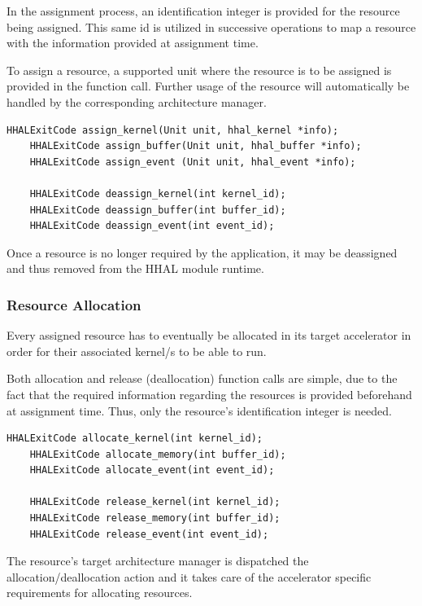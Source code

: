 In the assignment process, an identification integer is provided for the resource being assigned. This same id is utilized in successive operations to map a resource with the information provided at assignment time.

To assign a resource, a supported unit where the resource is to be assigned is provided in the function call. Further usage of the resource will automatically be handled by the corresponding architecture manager.

\begin{lstlisting}[style=CStyle, caption=HHAL API - Assign functions]
    HHALExitCode assign_kernel(Unit unit, hhal_kernel *info);
    HHALExitCode assign_buffer(Unit unit, hhal_buffer *info);
    HHALExitCode assign_event (Unit unit, hhal_event *info);

    HHALExitCode deassign_kernel(int kernel_id);
    HHALExitCode deassign_buffer(int buffer_id);
    HHALExitCode deassign_event(int event_id);
\end{lstlisting}

Once a resource is no longer required by the application, it may be deassigned and thus removed from the HHAL module runtime.

\subsubsection{Resource Allocation}

Every assigned resource has to eventually be allocated in its target accelerator in order for their associated kernel/s to be able to run.

Both allocation and release (deallocation) function calls are simple, due to the fact that the required information regarding the resources is provided beforehand at assignment time. Thus, only the resource's identification integer is needed.

\begin{lstlisting}[style=CStyle, caption=HHAL API - Allocation functions]
    HHALExitCode allocate_kernel(int kernel_id);
    HHALExitCode allocate_memory(int buffer_id);
    HHALExitCode allocate_event(int event_id);

    HHALExitCode release_kernel(int kernel_id);
    HHALExitCode release_memory(int buffer_id);
    HHALExitCode release_event(int event_id);
\end{lstlisting}

The resource's target architecture manager is dispatched the allocation/deallocation action and it takes care of the accelerator specific requirements for allocating resources.

